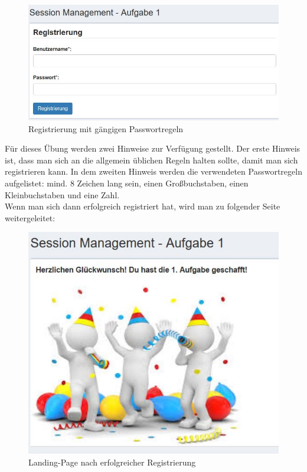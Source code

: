 \begin{figure}[H]
	
	\centering
	
	\includegraphics[width=1.0\linewidth]{images/BrokenAuthenticationAndSessionManagement/Registrierung_Start}
	
	\caption[Registrierung]{Registrierung mit gängigen Passwortregeln}
	
	\label{fig:Aufgabe 1 Registrierung}
	
\end{figure}
Für dieses Übung werden zwei Hinweise zur Verfügung gestellt. Der erste Hinweis ist, dass man sich an die allgemein üblichen Regeln halten sollte, damit man sich registrieren kann. In dem zweiten Hinweis werden die verwendeten Passwortregeln aufgelistet: mind. 8 Zeichen lang sein, einen Großbuchstaben, einen Kleinbuchstaben und eine Zahl. \\
Wenn man sich dann erfolgreich registriert hat, wird man zu folgender Seite weitergeleitet:\\
\begin{figure}[H]
	\includegraphics[width=1.0\linewidth]{images/BrokenAuthenticationAndSessionManagement/Registrierung_Ende}
	\caption[Registrierung]{Landing-Page nach erfolgreicher Registrierung}
	\label{fig:Aufgabe 1 Abschluss}
\end{figure}
